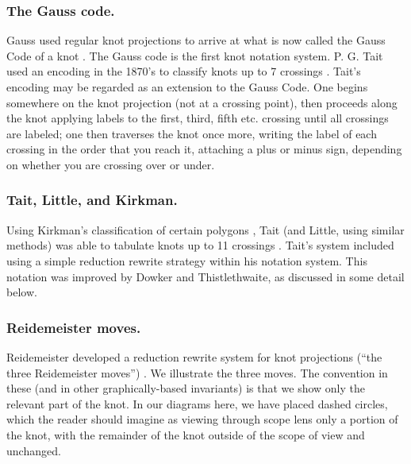 \subsubsection{The Gauss code.} Gauss used regular knot projections to
arrive at what is now called the Gauss Code of a knot
\cite{Read1977On-the-Gauss-cr}. The Gauss code is the first knot notation
system. P. G. Tait used an encoding in the 1870's to classify knots up
to 7 crossings \cite{Tait}. Tait's encoding may be regarded as an
extension to the Gauss Code. One begins somewhere on the knot
projection (not at a crossing point), then proceeds along the knot
applying labels to the first, third, fifth etc. crossing until all
crossings are labeled; one then traverses the knot once more, writing
the label of each crossing in the order that you reach it, attaching a
plus or minus sign, depending on whether you are crossing over or
under.

\subsubsection{Tait, Little, and Kirkman.} Using Kirkman's
classification of certain polygons \cite{Kirkman1885The-enumeration},
Tait (and Little, using similar methods) was able to tabulate knots up
to 11 crossings \cite{Tait} \cite{Little1885On-knots-with-a}
\cite{Little1890Alternate-pm-kn}
\cite{Little1900Non-alternate-p}. Tait's system included using a
simple reduction rewrite strategy within his notation system. This notation was improved by Dowker and Thistlethwaite, as discussed in some detail below.



\subsubsection{Reidemeister moves.} Reidemeister developed a reduction
rewrite system for knot projections (“the three Reidemeister moves”)
\cite{ReidemeisterMoves}. We illustrate the three moves. The
convention in these (and in other graphically-based invariants) is
that we show only the relevant part of the knot. In our diagrams here,
we have placed dashed circles, which the reader should imagine as
viewing through scope lens only a portion of the knot, with
the remainder of the knot outside of the scope of view and unchanged.

